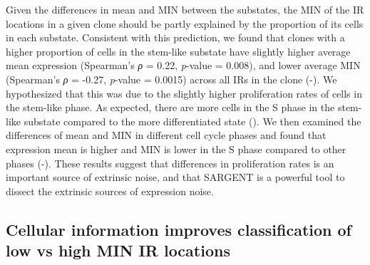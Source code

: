 \begin{figure}[t!]
    \centering
\end{figure}

Given the differences in mean and MIN between the substates, the MIN of the IR locations in a given clone should be partly explained by the proportion of its cells in each substate. Consistent with this prediction, we found that clones with a higher proportion of cells in the stem-like substate have slightly higher average mean expression (Spearman’s \textit{ρ} = 0.22, \textit{p}-value = 0.008), and lower average MIN (Spearman’s \textit{ρ} = -0.27, \textit{p}-value = 0.0015) across all IRs in the clone (-). We hypothesized that this was due to the slightly higher proliferation rates of cells in the stem-like phase. As expected, there are more cells in the S phase in the stem-like substate compared to the more differentiated state (). We then examined the differences of mean and MIN in different cell cycle phases and found that expression mean is higher and MIN is lower in the S phase compared to other phases (-). These results suggest that differences in proliferation rates is an important source of extrinsic noise, and that SARGENT is a powerful tool to dissect the extrinsic sources of expression noise. 

\subsection{Cellular information improves classification of low vs high MIN IR locations}

